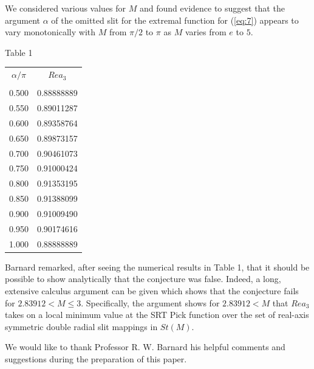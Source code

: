 \documentclass[12pt]{article}%
\begin{document}
We considered various values for $M$ and found evidence to suggest
that the argument $\alpha$ of the omitted slit for the extremal
function for (\ref{eq:7}) appears to vary monotonically with $M$ from
$\pi /2$ to $\pi$ as $M$ varies from $e$ to $5.$

\vspace*{12pt}
\centerline{Table 1}
\vspace*{12pt}

\begin{center}
\begin{tabular}{ll}
\multicolumn{1}{c}{$\alpha/\pi$} & \multicolumn{1}{c}{$Re a_3$}\\\\
0.500 & 0.88888889\\
0.550 & 0.89011287\\
0.600 & 0.89358764\\
0.650 & 0.89873157\\
0.700 & 0.90461073\\
0.750 & 0.91000424\\
0.800 & 0.91353195\\
0.850 & 0.91388099\\
0.900 & 0.91009490\\
0.950 & 0.90174616\\
1.000 & 0.88888889\end{tabular}\end{center}\vspace*{12pt}

Barnard remarked, after seeing the numerical results in Table 1, that
it should be possible to show analytically that the conjecture was
false.  Indeed, a long, extensive calculus argument can be given
which shows that the conjecture fails for $2.83912 < M \leq 3$.
Specifically, the argument shows for $2.83912 < M$ that $Rea_3$ takes
on a local minimum value at the SRT Pick function over the set of
real-axis symmetric double radial slit mappings in $St(M)$.

We would like to thank Professor R. W. Barnard his helpful comments
and suggestions during the preparation of this paper. 

\newpage
\end{document}
